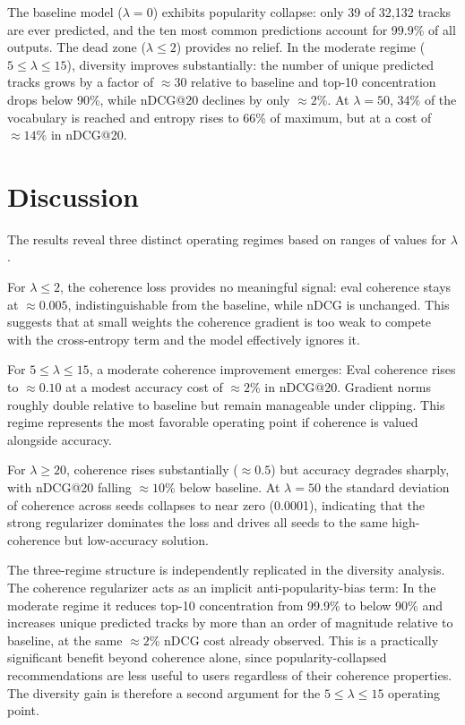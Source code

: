 \documentclass[conference]{IEEEtran}
\begin{document}
The baseline model ($\lambda=0$) exhibits popularity collapse: only 39 of 32,132 tracks are ever predicted,
and the ten most common predictions account for 99.9\% of all outputs. The dead zone ($\lambda \leq 2$)
provides no relief. In the moderate regime ($5 \leq \lambda \leq 15$), diversity improves substantially:
the number of unique predicted tracks grows by a factor of ${\approx}30$ relative to baseline and top-10 concentration
drops below 90\%, while nDCG@20 declines by only ${\approx}2$\%. At $\lambda=50$, 34\% of the vocabulary
is reached and entropy rises to 66\% of maximum, but at a cost of ${\approx}14$\% in nDCG@20.

\section{Discussion}

The results reveal three distinct operating regimes based on ranges of values for $\lambda$.

For $\lambda \leq 2$, the coherence loss provides no meaningful signal: eval coherence stays at ${\approx}0.005$,
indistinguishable from the baseline, while nDCG is unchanged. This suggests that at small weights the coherence gradient 
is too weak to compete with the cross-entropy term and the model effectively ignores it.

For $5 \leq \lambda \leq 15$, a moderate coherence improvement emerges: Eval coherence rises to ${\approx}0.10$ at a modest accuracy cost of ${\approx}2$\% in nDCG@20. 
Gradient norms roughly double relative to baseline but remain manageable under clipping. This regime represents the most favorable 
operating point if coherence is valued alongside accuracy.

For $\lambda \geq 20$, coherence rises substantially (${\approx}0.5$) but accuracy degrades sharply, 
with nDCG@20 falling ${\approx}10$\% below baseline. At $\lambda=50$ the standard deviation of coherence across seeds 
collapses to near zero (0.0001), indicating that the strong regularizer dominates the loss and drives all seeds to the 
same high-coherence but low-accuracy solution.

The three-regime structure is independently replicated in the diversity analysis. The coherence regularizer acts as
an implicit anti-popularity-bias term: In the moderate regime it reduces top-10 concentration from 99.9\% to below
90\% and increases unique predicted tracks by more than an order of magnitude relative to baseline, at the same
${\approx}2$\% nDCG cost already observed. This is a practically significant benefit beyond coherence alone, since
popularity-collapsed recommendations are less useful to users regardless of their coherence properties. The diversity
gain is therefore a second argument for the $5 \leq \lambda \leq 15$ operating point.
\end{document}
